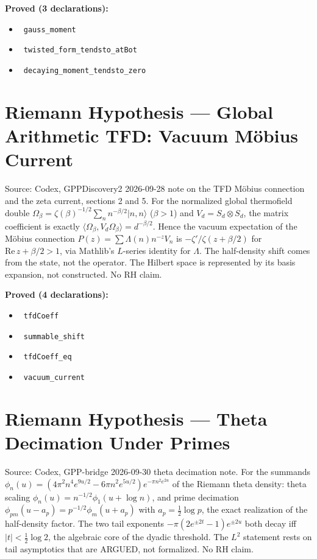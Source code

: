 \documentclass{report}
\theoremstyle{definition}
\begin{document}
\noindent\textbf{Proved (3 declarations):}
\begin{itemize}
  \item {}\leanok\ \texttt{gauss\_moment}
  \item {}\leanok\ \texttt{twisted\_form\_tendsto\_atBot}
  \item {}\leanok\ \texttt{decaying\_moment\_tendsto\_zero}
\end{itemize}

\section{Riemann Hypothesis --- Global Arithmetic TFD: Vacuum Möbius Current}
Source: Codex, GPPDiscovery2 2026-09-28 note on the TFD Möbius connection and the zeta current, sections 2 and 5. For the normalized global thermofield double $\Omega_\beta=\zeta(\beta)^{-1/2}\sum_n n^{-\beta/2}|n,n\rangle$ ($\beta>1$) and $V_d=S_d\otimes S_d$, the matrix coefficient is exactly $\langle\Omega_\beta,V_d\Omega_\beta\rangle=d^{-\beta/2}$. Hence the vacuum expectation of the Möbius connection $P(z)=\sum\Lambda(n)n^{-z}V_n$ is $-\zeta'/\zeta(z+\beta/2)$ for $\mathrm{Re}\,z+\beta/2>1$, via Mathlib's $L$-series identity for $\Lambda$. The half-density shift comes from the state, not the operator. The Hilbert space is represented by its basis expansion, not constructed. No RH claim.

\noindent\textbf{Proved (4 declarations):}
\begin{itemize}
  \item {}\leanok\ \texttt{tfdCoeff}
  \item {}\leanok\ \texttt{summable\_shift}
  \item {}\leanok\ \texttt{tfdCoeff\_eq}
  \item {}\leanok\ \texttt{vacuum\_current}
\end{itemize}

\section{Riemann Hypothesis --- Theta Decimation Under Primes}
Source: Codex, GPP-bridge 2026-09-30 theta decimation note. For the summands $\phi_n(u)=(4\pi^2n^4e^{9u/2}-6\pi n^2e^{5u/2})e^{-\pi n^2e^{2u}}$ of the Riemann theta density: theta scaling $\phi_n(u)=n^{-1/2}\phi_1(u+\log n)$, and prime decimation $\phi_{pm}(u-a_p)=p^{-1/2}\phi_m(u+a_p)$ with $a_p=\tfrac12\log p$, the exact realization of the half-density factor. The two tail exponents $-\pi(2e^{\pm2t}-1)e^{\pm2u}$ both decay iff $|t|<\tfrac12\log2$, the algebraic core of the dyadic threshold. The $L^2$ statement rests on tail asymptotics that are ARGUED, not formalized. No RH claim.
\end{document}
